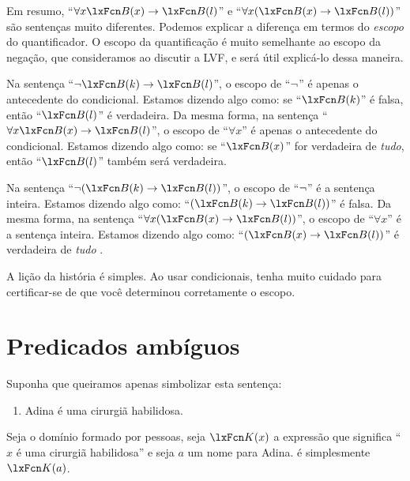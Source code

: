 Em resumo, \textquotedblleft $\forall x \atom{B}{x} \eif \atom{B}{l}$\textquotedblright{} e \textquotedblleft $\forall x (\atom{B}{x} \eif \atom{B}{l})$\textquotedblright{} são sentenças muito diferentes. Podemos explicar a diferença em termos do \emph{escopo} do quantificador. O escopo da quantificação é muito semelhante ao escopo da negação, que consideramos ao discutir a LVF, e será útil explicá-lo dessa maneira.

Na sentença \textquotedblleft $\enot \atom{B}{k} \eif \atom{B}{l}$\textquotedblright{}, o escopo de \textquotedblleft $\neg$\textquotedblright{} é apenas o antecedente do condicional. Estamos dizendo algo como: se \textquotedblleft $\atom{B}{k}$\textquotedblright{} é falsa, então \textquotedblleft $\atom{B}{l}$\textquotedblright{} é verdadeira. Da mesma forma, na sentença \textquotedblleft $\forall x \atom{B}{x} \eif \atom{B}{l}$\textquotedblright{}, o escopo de \textquotedblleft $\forall x$\textquotedblright{} é apenas o antecedente do condicional. Estamos dizendo algo como: se \textquotedblleft $\atom{B}{x}$\textquotedblright{} for verdadeira de \emph{tudo}, então \textquotedblleft $\atom{B}{l}$\textquotedblright{} também será verdadeira.

Na sentença \textquotedblleft $\enot(\atom{B}{k} \eif \atom{B}{l})$\textquotedblright{}, o escopo de \textquotedblleft $\neg$\textquotedblright{} é a sentença inteira. Estamos dizendo algo como: \textquotedblleft $(\atom{B}{k} \eif \atom{B}{l})$\textquotedblright{} é falsa. Da mesma forma, na sentença \textquotedblleft $\forall x (\atom{B}{x} \eif \atom{B}{l})$\textquotedblright{}, o escopo de \textquotedblleft $\forall x$\textquotedblright{} é a sentença inteira. Estamos dizendo algo como: \textquotedblleft $(\atom{B}{x} \eif \atom{B}{l})$\textquotedblright{} é verdadeira de \emph{tudo} .

A lição da história é simples. Ao usar condicionais, tenha muito cuidado para certificar-se de que você determinou corretamente o escopo.

\section{Predicados ambíguos}

Suponha que queiramos apenas simbolizar esta sentença:
\begin{enumerate}
\item\label{surgeon1} Adina é uma cirurgiã habilidosa.
\end{enumerate}
Seja o domínio formado por pessoas, seja $\atom{K}{x}$ a expressão que significa \textquotedblleft $x$ é uma cirurgiã habilidosa\textquotedblright{} e seja $a$ um nome para Adina.  é simplesmente $\atom{K}{a}$.


